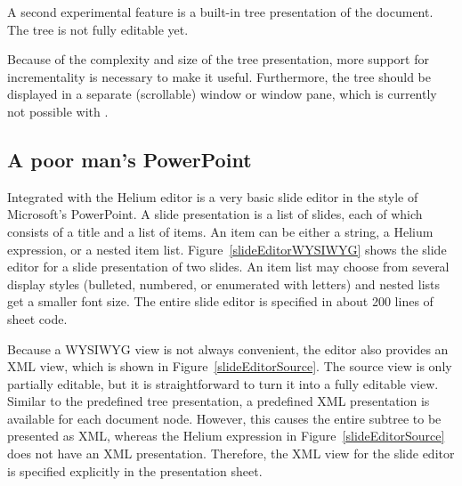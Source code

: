  \then




A second experimental feature is a built-in tree presentation of the document. The tree is not fully editable yet.


Because of the complexity and size of the tree presentation, more support for incrementality is necessary to make it useful. Furthermore, the tree should be displayed in a separate (scrollable) window or window pane, which is currently not possible with {\Xprez}.



\subsection{A poor man's PowerPoint}

Integrated with the Helium editor is a very basic slide editor in the style of Microsoft's PowerPoint. A slide presentation is a list of slides, each of which consists of a title and a list of items. An item can be either a string, a Helium expression, or a nested item list. Figure~\ref{slideEditorWYSIWYG} shows the slide editor for a slide presentation of two slides. An item list may choose from several display styles (bulleted, numbered, or enumerated with letters) and nested lists get a smaller font size. The entire slide editor is specified in about 200 lines of sheet code.

Because a WYSIWYG view is not always convenient, the editor also provides an XML view, which is shown in Figure~\ref{slideEditorSource}. The source view is only partially editable, but it is straightforward to turn it into a fully editable view. Similar to the predefined tree presentation, a predefined XML presentation is available for each document node. However, this causes the entire subtree to be presented as XML, whereas the Helium expression in Figure~\ref{slideEditorSource} does not have an XML presentation. Therefore, the XML view for the slide editor is  specified explicitly in the presentation sheet.

